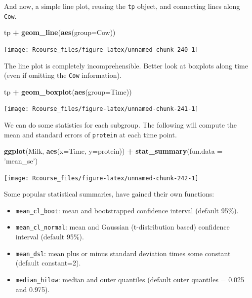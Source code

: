 \documentclass[]{book}
\newenvironment{Shaded}{\begin{snugshade}}{\end{snugshade}}
\newcommand{\KeywordTok}[1]{\textcolor[rgb]{0.13,0.29,0.53}{\textbf{#1}}}
\newcommand{\DataTypeTok}[1]{\textcolor[rgb]{0.13,0.29,0.53}{#1}}
\newcommand{\StringTok}[1]{\textcolor[rgb]{0.31,0.60,0.02}{#1}}
\newcommand{\OperatorTok}[1]{\textcolor[rgb]{0.81,0.36,0.00}{\textbf{#1}}}
\newcommand{\NormalTok}[1]{#1}
\providecommand{\tightlist}{%
  \setlength{\itemsep}{0pt}\setlength{\parskip}{0pt}}
\theoremstyle{definition}
\theoremstyle{definition}
\theoremstyle{definition}
\theoremstyle{remark}
\begin{document}
And now, a simple line plot, reusing the \texttt{tp} object, and
connecting lines along \texttt{Cow}.

\begin{Shaded}
\begin{Highlighting}[]
\NormalTok{tp }\OperatorTok{+}\StringTok{ }\KeywordTok{geom_line}\NormalTok{(}\KeywordTok{aes}\NormalTok{(}\DataTypeTok{group=}\NormalTok{Cow))}
\end{Highlighting}
\end{Shaded}

\texttt{[image: Rcourse\_files/figure-latex/unnamed-chunk-240-1]}

The line plot is completely incomprehensible. Better look at boxplots
along time (even if omitting the \texttt{Cow} information).

\begin{Shaded}
\begin{Highlighting}[]
\NormalTok{tp }\OperatorTok{+}\StringTok{ }\KeywordTok{geom_boxplot}\NormalTok{(}\KeywordTok{aes}\NormalTok{(}\DataTypeTok{group=}\NormalTok{Time))}
\end{Highlighting}
\end{Shaded}

\texttt{[image: Rcourse\_files/figure-latex/unnamed-chunk-241-1]}

We can do some statistics for each subgroup. The following will compute
the mean and standard errors of \texttt{protein} at each time point.

\begin{Shaded}
\begin{Highlighting}[]
\KeywordTok{ggplot}\NormalTok{(Milk, }\KeywordTok{aes}\NormalTok{(}\DataTypeTok{x=}\NormalTok{Time, }\DataTypeTok{y=}\NormalTok{protein)) }\OperatorTok{+}
\StringTok{  }\KeywordTok{stat_summary}\NormalTok{(}\DataTypeTok{fun.data =} \StringTok{'mean_se'}\NormalTok{)}
\end{Highlighting}
\end{Shaded}

\texttt{[image: Rcourse\_files/figure-latex/unnamed-chunk-242-1]}

Some popular statistical summaries, have gained their own functions:

\begin{itemize}
\tightlist
\item
  \texttt{mean\_cl\_boot}: mean and bootstrapped confidence interval
  (default 95\%).
\item
  \texttt{mean\_cl\_normal}: mean and Gaussian (t-distribution based)
  confidence interval (default 95\%).
\item
  \texttt{mean\_dsl}: mean plus or minus standard deviation times some
  constant (default constant=2).
\item
  \texttt{median\_hilow}: median and outer quantiles (default outer
  quantiles = 0.025 and 0.975).
\end{itemize}
\end{document}

